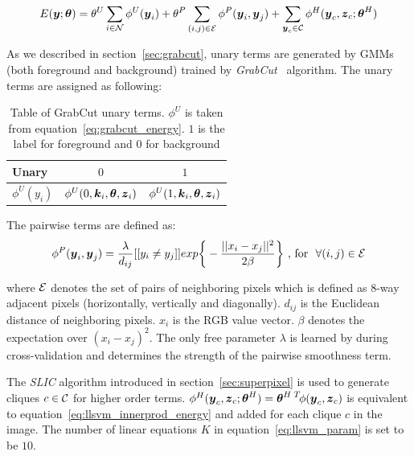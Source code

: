 \begin{align}
  \label{eq:grabcut_mrflssvm_energy}
  E({\boldsymbol{y}};\boldsymbol{\theta})=\theta^U\sum_{i\in {\cal N}}{\phi^U({\boldsymbol{y}}_i)}+
  \theta^P\sum_{(i,j)\in {\cal E}}{\phi^P({\boldsymbol{y}}_i,{\boldsymbol{y}}_j)}+
  \sum_{{\boldsymbol{y}}_c\in {\cal C}}{\phi^H({\boldsymbol{y}}_c,{\boldsymbol{z}}_c;\boldsymbol{\theta}^H)}
\end{align}

As we described in section~\ref{sec:grabcut}, unary terms are
generated by GMMs (both foreground and background) trained by
\emph{GrabCut}~\cite{Rother:SIGGRAPH04} algorithm. The unary
terms are assigned as following:

\begin{table}[h]
  \normalsize
  \centering
  \begin{tabular}{|l|c|c|}
    \hline
    {\sc Unary} & {\sc $0$} & {\sc $1$}\\
    \hline
    $\phi^U(y_i)$ & $\phi^U(0,{\boldsymbol{k}}_i,\boldsymbol{\theta},{\boldsymbol{z}}_i)$ & $\phi^U(1,{\boldsymbol{k}}_i,\boldsymbol{\theta},{\boldsymbol{z}}_i)$ \\
    \hline
  \end{tabular}
  \caption{\label{tab:grabCut_unary} Table of GrabCut unary
    terms. $\phi^U$ is taken from
    equation~\eqref{eq:grabcut_energy}. $1$ is the label for
    foreground and $0$ for background}
\end{table}

The pairwise terms are defined as:
\begin{align}
  \label{eq:mrflssvm_grabcut_pairwise}
  \phi^P({\boldsymbol{y}}_i,{\boldsymbol{y}}_j) = \frac{\lambda}{d_{ij}}[[y_i\neq y_j]]exp\bigg\{-\frac{||x_i-x_j||^2}{2\beta}\bigg\} \text{~,~for~~} \forall (i,j)\in {\cal E}
\end{align}

where ${\cal E}$ denotes the set of pairs of neighboring pixels which
is defined as 8-way adjacent pixels (horizontally, vertically and
diagonally). $d_{ij}$ is the Euclidean distance of neighboring
pixels. $x_i$ is the RGB value vector. $\beta$ denotes the
expectation over $(x_i-x_j)^2$. The only free parameter $\lambda$
is learned by  during cross-validation and
determines the strength of the pairwise smoothness term.

The \emph{SLIC} algorithm introduced in
section~\ref{sec:superpixel} is used to generate cliques $c\in{\cal C}$
for higher order terms.
$\phi^H({\boldsymbol{y}}_c,{\boldsymbol{z}}_c;\boldsymbol{\theta}^H)=\boldsymbol{\theta}^{H\;T} \!
\phi({\boldsymbol{y}}_c,{\boldsymbol{z}}_c)$ is equivalent to
equation~\eqref{eq:llsvm_innerprod_energy} and added for each
clique $c$ in the image. The number of linear equations $K$ in
equation~\eqref{eq:llsvm_param} is set to be $10$.

